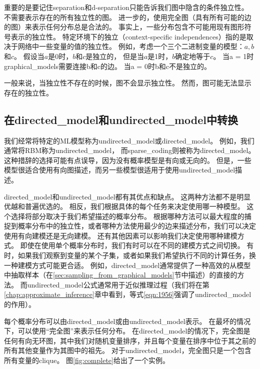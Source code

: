 重要的是要记住\gls{separation}和d-\gls{separation}只能告诉我们图中隐含的条件独立性。
不需要表示存在的所有独立性的图。 
进一步的，使用完全图（具有所有可能的边的图）来表示任何分布总是合法的。
事实上，一些分布包含不可能用现有图形符号表示的独立性。
特定环境下的独立（context-specific independences）指的是取决于网络中一些变量的值的独立性。
例如，考虑一个三个二进制变量的模型：$a, b $和$c$。
假设当$a$是0时，$b$和$c$是独立的， 但是当$a$是1时，$b$确定地等于$c$。
当a = 1时\gls{graphical_models}需要连接b和c的边。
当a = 0时b和c不是独立的。

一般来说，当独立性不存在的时候，图不会显示独立性。 
然而，图可能无法显示存在的独立性。

\subsection{在\gls{directed_model}和\gls{undirected_model}中转换}
\label{sec:converting_between_undirected_and_directed_graphs}

我们经常将特定的\gls{ML}模型称为\gls{undirected_model}或\gls{directed_model}。
例如，我们通常将\gls{RBM}称为\gls{undirected_model}， 而\gls{sparse_coding}则被称为\gls{directed_model}。
这种措辞的选择可能有点误导，因为没有概率模型是有向或无向的。
但是，一些模型很适合使用有向图描述，而另一些模型很适用于使用\gls{undirected_model}描述。

\gls{directed_model}和\gls{undirected_model}都有其优点和缺点。
这两种方法都不是明显优越和普遍优选的。
相反，我们根据具体的每个任务来决定使用哪一种模型。 
这个选择将部分取决于我们希望描述的概率分布。
根据哪种方法可以最大程度的捕捉到概率分布中的独立性，或者哪种方法使用最少的边来描述分布，我们可以决定使用有向建模还是无向建模。
还有其他因素可以影响我们决定使用哪种建模方式。 
即使在使用单个概率分布时，我们有时可以在不同的建模方式之间切换。
有时，如果我们观察到变量的某个子集，或者如果我们希望执行不同的计算任务，换一种建模方式可能更合适。
例如，\gls{directed_model}通常提供了一种高效的从模型中抽取样本（在\ref{sec:sampling_from_graphical_models}节中描述）的直接的方法。
而\gls{undirected_model}公式通常用于近似推理过程（我们将在第\ref{chap:approximate_inference}章中看到，等式\eqref{eqn:1956}强调了\gls{undirected_model}的作用）。


每个概率分布可以由\gls{directed_model}或由\gls{undirected_model}表示。
在最坏的情况下，可以使用``完全图''来表示任何分布。
在\gls{directed_model}的情况下，完全图是任何有向无环图，其中我们对随机变量排序，并且每个变量在排序中位于其之前的所有其他变量作为其图中的祖先。
对于\gls{undirected_model}，完全图只是一个包含所有变量的\gls{clique}。 
图\ref{fig:complete}给出了一个实例。

